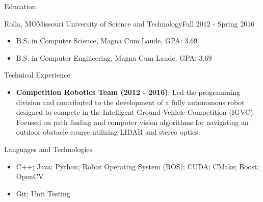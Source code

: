 \documentclass[]{mcdowellcv}
\begin{document}
\begin{cvsection}{Education}
    \begin{cvsubsection}[2]{Rolla, MO}{Missouri University of Science and Technology}{Fall 2012 - Spring 2016}
        \begin{itemize}
            \item B.S. in Computer Science, Magna Cum Laude, GPA: 3.69
            \item B.S. in Computer Engineering, Magna Cum Laude, GPA: 3.69
        \end{itemize}
    \end{cvsubsection}
\end{cvsection} 

\begin{cvsection}{Technical Experience}
    \begin{cvsubsection}{}{}{}  
        \begin{itemize} 
            \item \textbf{Competition Robotics Team (2012 - 2016)}: Led the programming division and contributed to the development of a fully autonomous robot designed to compete in the Intelligent Ground Vehicle Competition (IGVC). Focused on path finding and computer vision algorithms for navigating an outdoor obstacle course utilizing LIDAR and stereo optics.
        \end{itemize}
    \end{cvsubsection}
\end{cvsection}

\begin{cvsection}{Languages and Technologies}
    \begin{cvsubsection}{}{}{}  
        \begin{itemize}
            \item C++; Java; Python; Robot Operating System (ROS); CUDA; CMake; Boost; OpenCV 
            \item Git; Unit Testing
        \end{itemize}
    \end{cvsubsection}
\end{cvsection}
\end{document}
